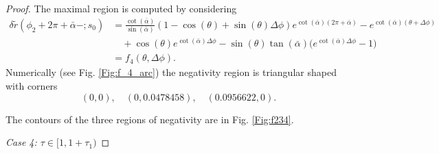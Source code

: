 \documentclass[reqno]{amsart}
\theoremstyle{definition} \newtheorem{definition}{Definition}[section]
\theoremstyle{definition} \newtheorem{remark}[definition]{Remark}
\theoremstyle{plain} \newtheorem{lemma}[definition]{Lemma}
\theoremstyle{plain} \newtheorem{proposition}[definition]{Proposition}
\theoremstyle{plain} \newtheorem{theorem}[definition]{Theorem}
\theoremstyle{plain} \newtheorem{corollary}[definition]{Corollary}
\theoremstyle{definition} \newtheorem{example}[definition]{Example}
\theoremstyle{plain} \newtheorem{claim}[clai]{Claim}
\theoremstyle{definition} \newtheorem{assumption}[definition]{Assumption}
\theoremstyle{definition} \newtheorem{observation}[definition]{Observation}
\newcommand{\1}{\mathbbm 1}
\numberwithin{equation}{section} %
\theoremstyle{plain} \newtheorem*{theorem*}{Theorem}
\theoremstyle{plain} \newtheorem{mthm}[maintheorem]{Main Theorem}
\theoremstyle{plain} \newtheorem*{mthm*}{Main Theorem}
\theoremstyle{plain} \newtheorem*{conjecture*}{Conjecture}
\theoremstyle{plain} \newtheorem{conjecture}[definition]{Conjecture}
\theoremstyle{plain} \newtheorem*{problem*}{Problem}
\begin{document}
\begin{proof}
The maximal region is computed by considering
\begin{equation}
\label{Equa:f4_arc}
\begin{split}
\delta \tilde r(\phi_2 + 2\pi + \bar \alpha -;s_0) &= \frac{\cot(\bar \alpha)}{\sin(\bar \alpha)} (1 - \cos(\theta) + \sin(\theta) \Delta \phi) e^{\cot(\bar \alpha) (2\pi + \bar \alpha)} - e^{\cot(\bar \alpha) (\theta + \Delta \phi)} \\
& \quad + \cos(\theta) e^{\cot(\bar \alpha) \Delta \phi} - \sin(\theta) \tan(\bar \alpha) \big( e^{\cot(\bar \alpha) \Delta \phi} - 1 \big) \\
&= f_4(\theta,\Delta \phi).
\end{split}
\end{equation}
Numerically (see Fig. \ref{Fig:f_4_arc}) the negativity region is triangular shaped with corners
\begin{equation*}
    (0,0), \quad (0,0.0478458), \quad (0.0956622,0).
\end{equation*}

The contours of the three regions of negativity are in Fig. \ref{Fig:f234}.

\medskip

{\it Case 4: $\tau \in [1,1+\tau_1)$} 


\end{proof}
\end{document}
